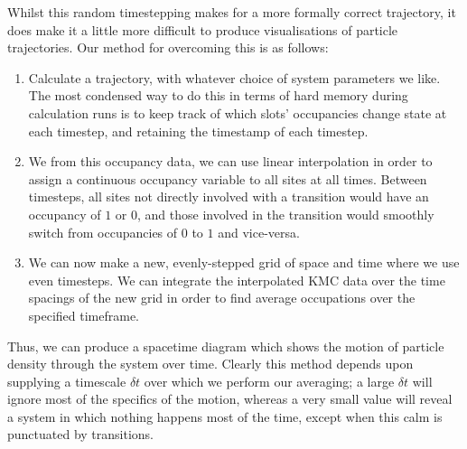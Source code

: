 Whilst this random timestepping makes for a more formally correct trajectory, it does make it a
little more difficult to produce visualisations of particle trajectories. Our method for overcoming
this is as follows:
\begin{enumerate}
 \item Calculate a trajectory, with whatever choice of system parameters we like. The most 
 condensed way to do this in terms of hard memory during calculation runs is to keep track of which
 slots' occupancies change state at each 
 timestep, and retaining the timestamp of each timestep.
 \item We from this occupancy data, we can use linear interpolation in order to assign a continuous
 occupancy variable to all sites at all times. Between timesteps, all sites not directly involved
 with a transition would have an occupancy of $1$ or $0$, and those involved in the transition
 would smoothly switch from occupancies of $0$ to $1$ and vice-versa.
 \item We can now make a new, evenly-stepped grid of space and time where we use even timesteps.
 We can integrate the interpolated KMC data over the time spacings of the new grid in order to
 find average occupations over the specified timeframe. 
\end{enumerate}
Thus, we can produce a spacetime diagram which shows the motion of particle density through the 
system over time. Clearly this method depends upon supplying a timescale $\delta t$ over which we
perform our averaging; a large $\delta t$ will ignore most of the specifics of the motion, whereas
a very small value will reveal a system in which nothing happens most of the time, except when
this calm is punctuated by transitions.

